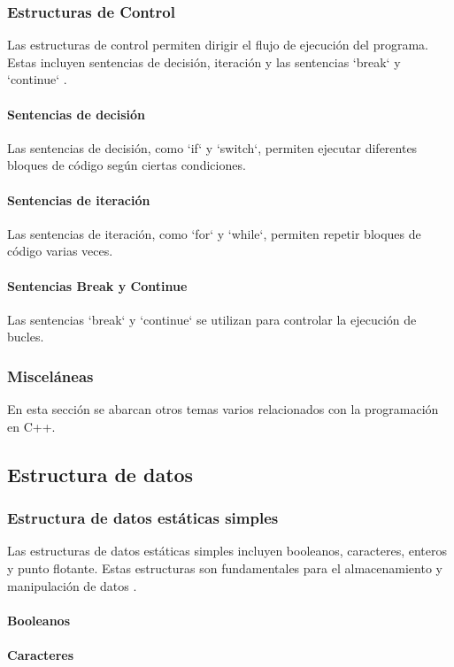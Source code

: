 \subsubsection{Estructuras de Control}
Las estructuras de control permiten dirigir el flujo de ejecución del programa. Estas incluyen sentencias de decisión, iteración y las sentencias `break` y `continue` \cite{gaddis2018starting}.
\paragraph{Sentencias de decisión}
Las sentencias de decisión, como `if` y `switch`, permiten ejecutar diferentes bloques de código según ciertas condiciones.
\paragraph{Sentencias de iteración}
Las sentencias de iteración, como `for` y `while`, permiten repetir bloques de código varias veces.
\paragraph{Sentencias Break y Continue}
Las sentencias `break` y `continue` se utilizan para controlar la ejecución de bucles.

\subsubsection{Misceláneas}
En esta sección se abarcan otros temas varios relacionados con la programación en C++.

\subsection{Estructura de datos}
\subsubsection{Estructura de datos estáticas simples}
Las estructuras de datos estáticas simples incluyen booleanos, caracteres, enteros y punto flotante. Estas estructuras son fundamentales para el almacenamiento y manipulación de datos \cite{gaddis2018starting}.
\paragraph{Booleanos}
\paragraph{Caracteres}
